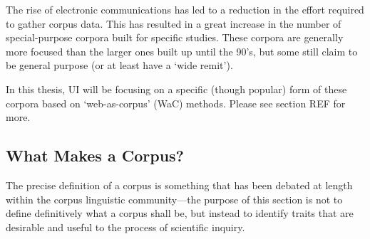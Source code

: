 % 


The rise of electronic communications has led to a reduction in the effort required to gather corpus data.  This has resulted in a great increase in the number of special-purpose corpora built for specific studies.  These corpora are generally more focused than the larger ones built up until the 90's, but some still claim to be general purpose (or at least have a `wide remit').  


In this thesis, UI will be focusing on a specific (though popular) form of these corpora based on `web-as-corpus' (WaC) methods.  Please see section REF for more.




\subsection{What Makes a Corpus?} %

The precise definition of a corpus is something that has been debated at length within the corpus linguistic community---the purpose of this section is not to define definitively what a corpus shall be, but instead to identify traits that are desirable and useful to the process of scientific inquiry.



